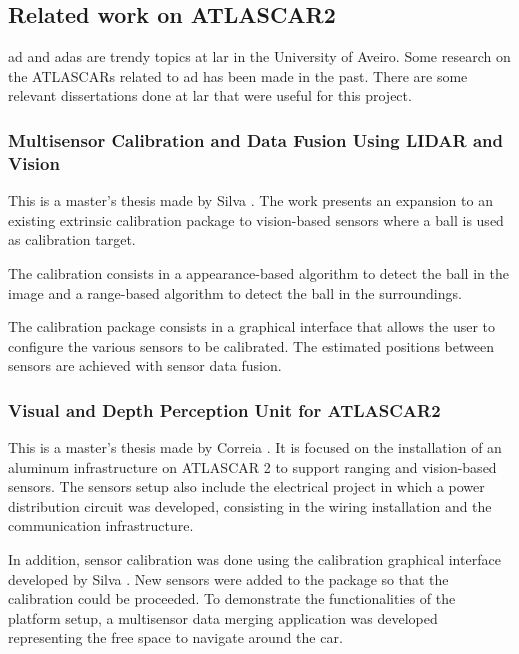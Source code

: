\subsection{Related work on ATLASCAR2}

\gls{ad} and \gls{adas} are trendy topics at \gls{lar} in the University of Aveiro. Some research on the ATLASCARs related to \gls{ad} has been made in the past. There are some relevant dissertations done at \gls{lar} that were useful for this project. 

\subsubsection{Multisensor Calibration and Data Fusion Using LIDAR and Vision} 

This is a master's thesis made by Silva \cite{VieiradaSilva2016}. The work presents an expansion to an existing extrinsic calibration package to vision-based sensors where a ball is used as calibration target. 

The calibration consists in a appearance-based algorithm to detect the ball in the image and a range-based algorithm to detect the ball in the surroundings. 

The calibration package consists in a graphical interface that allows the user to configure the various sensors to be calibrated. The estimated positions between sensors are achieved with sensor data fusion.

\subsubsection{Visual and Depth Perception Unit for	ATLASCAR2} 

This is a master's thesis made by Correia \cite{Correia2017}. It is focused on the installation of an aluminum infrastructure on ATLASCAR 2 to support ranging and vision-based sensors. The sensors setup also include the electrical project in which a power distribution circuit was developed, consisting in the wiring installation and the communication infrastructure. 

In addition, sensor calibration was done using the calibration graphical interface developed by Silva \cite{VieiradaSilva2016}. New sensors were added to the package so that the calibration could be proceeded. To demonstrate the functionalities of the platform setup, a multisensor data merging application was developed representing the free space to navigate around the car.

